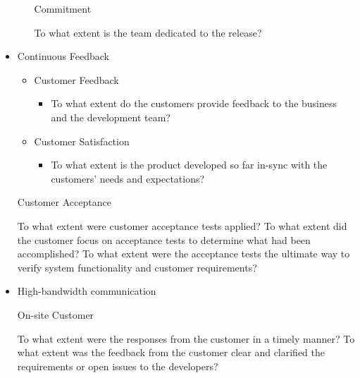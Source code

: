 \begin{appendices}
\begin{itemize}
\begin{itemize}
\begin{itemize}
				\end{itemize}
			\addition Commitment
				\begin{itemize}
					\addition To what extent is the team dedicated to the release?
				\end{itemize}
		\end{itemize}
	\item Continuous Feedback	
		\begin{itemize}
			\item Customer Feedback
				\begin{itemize}
					\item To what extent do the customers provide feedback to the business and the development team?
				\end{itemize}
		\end{itemize}
		\begin{itemize}
			\item Customer Satisfaction
				\begin{itemize}
					\item To what extent is the product developed so far in-sync with the customers' needs and expectations?
				\end{itemize}
		\end{itemize}
		\begin{itemize}
			\addition Customer Acceptance
				\begin{itemize}
					\addition To what extent were customer acceptance tests applied?
					\addition To what extent did the customer focus on acceptance tests to determine what had been accomplished?
					\addition To what extent were the acceptance tests the ultimate way to verify system functionality and customer requirements?
				\end{itemize}
		\end{itemize}
	\item High-bandwidth communication
		\begin{itemize}
			\addition On-site Customer
				\begin{itemize}
					\addition To what extent were the responses from the customer in a timely manner?
					\addition To what extent was the feedback from the customer clear and clarified the requirements or open issues to the developers?
				\end{itemize}
		\end{itemize}
		\begin{itemize}

\end{itemize}
\end{itemize}
\end{appendices}
